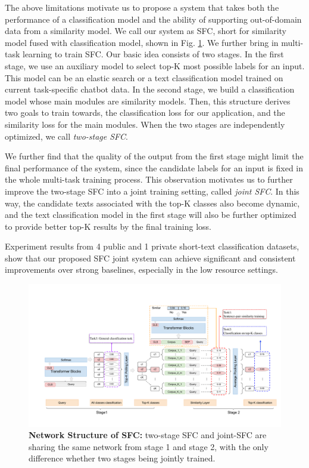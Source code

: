 The  above  limitations motivate us to propose a system that 
takes both the performance of a classification model and the ability of
supporting out-of-domain data from a similarity model.
We call our system as SFC,  short  for  similarity model fused with classification model, shown in
Fig.  \ref{fig:framework}.  We further bring in multi-task learning   \cite{caruana1993multitask,collobert2008unified,  liu2019multi} to train SFC.  
Our basic  idea  consists of two stages. In the first stage, we use an auxiliary model
to  select  top-K most possible labels for an input. This model can be an elastic
search  \cite{divya2013elasticsearch}  or a text classification model trained on
current   task-specific   chatbot   data.  In  the  second  stage,  we  build  a
classification  model  whose  main  modules  are  similarity  models. Then, this
structure  derives  two  goals to train towards, the classification loss for our
application,  and  the similarity loss for the main modules. When the two stages
are  independently optimized, we call \emph{two-stage SFC}. 

We further find that
the  quality of the output from the first stage might limit the final performance of the
system,  since  the  candidate labels for an input is fixed in the
whole  multi-task  training  process.  This  observation motivates us to further
improve  the  two-stage  SFC  into a joint training setting, called \emph{joint SFC}. In
this  way,  the  candidate texts associated  with the top-K classes also become
dynamic,  and  the  text  classification  model  in the first stage will also be
further optimized to provide better top-K results by the final training loss.

Experiment  results  from  4  public  and  1  private  short-text classification
datasets,  show  that  our proposed SFC joint system can achieve significant and
consistent  improvements  over  strong baselines, especially in the low resource
settings.

\begin{figure}[t]
  \begin{centering}
    \includegraphics[scale=0.66]{picture/picture4} 
    \par
  \end{centering}
  \caption{
    \textbf{Network Structure of SFC:} two-stage SFC and joint-SFC are sharing
    the  same  network  from  stage  1  and  stage 2, with the only difference
    whether two stages being jointly trained.
  }
  \label{fig:framework}
\end{figure}

